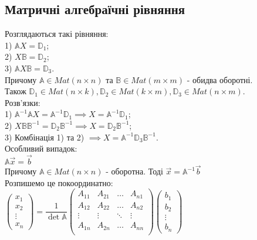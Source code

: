 \documentclass[a4paper, 10pt]{article}
\theoremstyle{theoremdd}
\theoremstyle{theoremdd}
\theoremstyle{theoremdd}
\theoremstyle{theoremdd}
\theoremstyle{theoremdd}
\theoremstyle{theoremdd}
\theoremstyle{theoremdd}
\theoremstyle{theoremdd}
\begin{document}
\subsection{Матричні алгебраїчні рівняння}
Розглядаються такі рівняння:\\
1) $\mathbb{A} X = \mathbb{D}_1$;\\
2) $X \mathbb{B} = \mathbb{D}_2$;\\
3) $\mathbb{A} X \mathbb{B} = \mathbb{D}_3$.\\
Причому $\mathbb{A} \in Mat(n \times n)$ та $\mathbb{B} \in Mat(m \times m)$ - обидва оборотні.\\
Також $\mathbb{D}_1 \in Mat(n \times k), \mathbb{D}_2 \in Mat(k \times m), \mathbb{D}_3 \in Mat(n \times m)$.\\
Розв'язки:\\
1) $\mathbb{A}^{-1} \mathbb{A} X = \mathbb{A}^{-1} \mathbb{D}_1 \implies X = \mathbb{A}^{-1} \mathbb{D}_1$;\\
2) $X \mathbb{B} \mathbb{B}^{-1} = \mathbb{D}_2 \mathbb{B}^{-1} \implies X = \mathbb{D}_2 \mathbb{B}^{-1}$;\\
3) Комбінація 1) та 2) $\implies X = \mathbb{A}^{-1} \mathbb{D}_3 \mathbb{B}^{-1}$.
\bigskip \\
Особливий випадок:\\
$\mathbb{A} \vec{x} = \vec{b}$\\
Причому $\mathbb{A} \in Mat(n \times n)$ - оборотна. Тоді $\vec{x} = \mathbb{A}^{-1} \vec{b}$\\
Розпишемо це покоординатно:\\
$\begin{pmatrix}
x_1 \\ x_2 \\ \vdots \\ x_n
\end{pmatrix} = \dfrac{1}{\det \mathbb{A}} \begin{pmatrix}
A_{11} & A_{21} & \dots & A_{n1} \\
A_{12} & A_{22} & \dots & A_{n2} \\
\vdots & \vdots & \ddots & \vdots \\
A_{1n} & A_{2n} & \dots & A_{nn} \\
\end{pmatrix} \begin{pmatrix}
b_1 \\ b_2 \\ \vdots \\ b_n
\end{pmatrix}$\\
\end{document}
